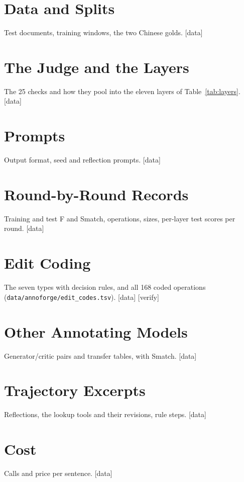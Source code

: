 \documentclass[11pt]{article}
\newcommand{\stag}[2]{\textcolor{#1}{\textsf{\scriptsize[#2]}}}
\newcommand{\HAVE}{\stag{green!50!black}{data}\xspace}
\newcommand{\CHK}{\stag{orange!80!black}{verify}\xspace}
\begin{document}
\appendix

\section{Data and Splits}
Test documents, training windows, the two Chinese golds. \HAVE

\section{The Judge and the Layers}
The 25 checks and how they pool into the eleven layers of Table~\ref{tab:layers}. \HAVE

\section{Prompts}
Output format, seed and reflection prompts. \HAVE

\section{Round-by-Round Records}
Training and test F and Smatch, operations, sizes, per-layer test scores per round. \HAVE

\section{Edit Coding}
The seven types with decision rules, and all 168 coded operations (\texttt{data/annoforge/edit\_codes.tsv}). \HAVE{} \CHK

\section{Other Annotating Models}
Generator/critic pairs and transfer tables, with Smatch. \HAVE

\section{Trajectory Excerpts}
Reflections, the lookup tools and their revisions, rule steps. \HAVE

\section{Cost}
Calls and price per sentence. \HAVE
\end{document}
